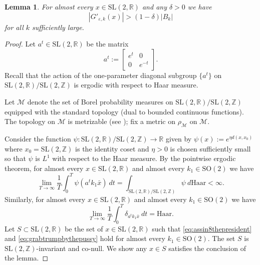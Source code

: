 \documentclass[10pt,reqno]{amsart}
\theoremstyle{Theorem}
\newtheorem{lemma}[theorem]{Lemma}
\theoremstyle{definition}
\theoremstyle{remark}
\newcommand{\note}[1]{\marginpar{{\color{red}\footnotesize \begin{spacing}{1}#1\end{spacing}}}}
\renewcommand{\epsilon}{\varepsilon}
\newcommand{\R}{\mathbb {R}}
\newcommand{\Z}{\mathbb {Z}}
\newcommand{\e}{\epsilon}
\newcommand{\Sl}{\mathrm{SL}}
\newcommand{\So}{\mathrm{SO}}
\def\SO{\So}
\def\calM{\mathcal M}
\def\blue{}
\begin{document}

\begin{lemma}\label{uni1} For almost every  $x \in \Sl(2,\R)$ and  any $\delta > 0$ we have   $$|G'_{\e, k}(x)| > (1- \delta) |B_k|$$ for all    $k$ sufficiently  large.
\end{lemma}\label{lem:aegood}
\def\calM{\mathcal M}
\begin{proof}
 Let $a^t\in \Sl(2,\R) $ be the matrix $$a^t :=  \begin{bmatrix} e^t&0\\0&e^{-t} \end{bmatrix}.$$ Recall that  the action of the one-parameter diagonal subgroup $\{a^t\}$  on $ \Sl(2,\R)/\Sl(2,\Z)$ is ergodic with respect to Haar measure.


{\blue Let $\calM$ denote the set of Borel probability measures on $\Sl(2,\R)/\Sl(2,\Z)$ equipped with the standard topology (dual to bounded  continuous functions).  The topology on $\calM$ is metrizable (see \cite[Theorem 6.8]{MR1700749});  fix a metric on $\rho_\calM$ on $\calM$. } %



Consider the function $\psi\colon \Sl(2,\R)/\Sl(2,\Z)\to \R$ given by  $\psi(x) := e^{\eta d(x,x_0)}$ where $x_0=   \Sl(2,\Z)$ is the identity coset and $\eta>0$ is chosen sufficiently small so that $\psi$ is $L^1$ with respect to the Haar measure.
 By the pointwise ergodic theorem, for almost every  $x \in \Sl(2,\R)$ and almost every  $k_1 \in \SO(2)$ we have
\begin{equation}\label{eq:assin8thepresident} \lim_{T \to \infty} \frac{1}{T} \int_{0}^T \psi(a^tk_1\bar{x}) \ dt = \int_{\Sl(2,\R)/\Sl(2,\Z)} \psi \ d\text{Haar} < \infty.\end{equation}
Similarly, for almost every  $x \in \Sl(2,\R)$ and almost every  $k_1 \in \SO(2)$ we have  \begin{equation}\label{eq:grabtrumpbythepussy}\lim_{T \to \infty}  \frac{1}{T} \int_{0}^T \delta_{a^tk_1\bar{x}}  \ dt =  \text {Haar}.\end{equation}
Let $S\subset \Sl(2,\R)$ be the set of  $x\in \Sl(2,\R)$ such that \eqref{eq:assin8thepresident} and  \eqref{eq:grabtrumpbythepussy} hold for almost every $k_1 \in \So(2)$.  The set $S$ is $\Sl(2,\Z)$-invariant and co-null.  We show any $x\in S$ satisfies the conclusion of the lemma.


\end{proof}
\end{document}
